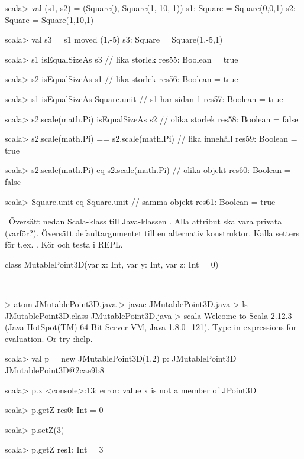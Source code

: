 \SubtaskSolved
\begin{REPL}
scala> val (s1, s2) = (Square(), Square(1, 10, 1))
s1: Square = Square(0,0,1)
s2: Square = Square(1,10,1)

scala> val s3 = s1 moved (1,-5)
s3: Square = Square(1,-5,1)

scala> s1 isEqualSizeAs s3       // lika storlek
res55: Boolean = true

scala> s2 isEqualSizeAs s1       // lika storlek
res56: Boolean = true

scala> s1 isEqualSizeAs Square.unit   // s1 har sidan 1
res57: Boolean = true

scala> s2.scale(math.Pi) isEqualSizeAs s2  // olika storlek
res58: Boolean = false

scala> s2.scale(math.Pi) == s2.scale(math.Pi) // lika innehåll
res59: Boolean = true

scala> s2.scale(math.Pi) eq s2.scale(math.Pi)  // olika objekt
res60: Boolean = false

scala> Square.unit eq Square.unit   // samma objekt
res61: Boolean = true
\end{REPL}

\QUESTEND




\QUESTBEGIN

\Task \what~Översätt nedan Scala-klass till Java-klassen . Alla attribut ska vara privata (varför?). Översätt defaultargumentet till en alternativ konstruktor. Kalla setters för t.ex. . Kör  och testa i REPL.

\begin{Code}
class MutablePoint3D(var x: Int, var y: Int, var z: Int = 0)
\end{Code}

\SOLUTION

\TaskSolved \what~


\begin{REPL}
> atom JMutablePoint3D.java
> javac JMutablePoint3D.java
> ls
JMutablePoint3D.class  JMutablePoint3D.java
> scala
Welcome to Scala 2.12.3 (Java HotSpot(TM) 64-Bit Server VM, Java 1.8.0_121).
Type in expressions for evaluation. Or try :help.

scala> val p = new JMutablePoint3D(1,2)
p: JMutablePoint3D = JMutablePoint3D@2cae9b8

scala> p.x
<console>:13: error: value x is not a member of JPoint3D

scala> p.getZ
res0: Int = 0

scala> p.setZ(3)

scala> p.getZ
res1: Int = 3

\end{REPL}

